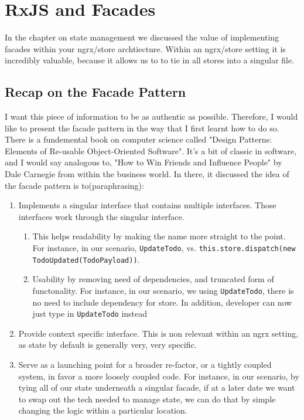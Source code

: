 \chapter{ RxJS and Facades }
In the chapter on state management we discussed the value of implementing facades within your ngrx/store archtiecture. Within an ngrx/store setting it is incredibly valuable, because it allows us to to tie in all stores into a singular file. 

\section{Recap on the Facade Pattern}
I want this piece of information to be as authentic as possible. Therefore, I would like to present the facade pattern in the way that I first learnt how to do so. There is a fundemental book on computer science called "Design Patterns: Elements of Re-usable Object-Oriented Software". It's a bit of classic in software, and I would say analogous to, "How to Win Friends and Influence People" by Dale Carnegie from within the business world. In there, it discussed the idea of the facade pattern is to(paraphrasing): 
\begin{enumerate}
  \item Implements a singular interface that contains multiple interfaces. Those interfaces work through the singular interface.
  \begin{enumerate}
    \item This helps readability by making the name more straight to the point. For instance, in our scenario, \lstinline{UpdateTodo}, vs. \lstinline{this.store.dispatch(new TodoUpdated(TodoPayload))}. 
    \item Usability by removing need of dependencies, and truncated form of functonality. For instance, in our scenario, we using \lstinline{UpdateTodo}, there is no need to include dependency for store. In addition, developer can now just type in \lstinline{UpdateTodo} instead 
  \end{enumerate}
  \item Provide context specific interface. This is non relevant within an ngrx setting, as state by default is generally very, very specific.
  \item Serve as a launching point for a broader re-factor, or a tightly coupled system, in favor a more loosely coupled code. For instance, in our scenario, by tying all of our state underneath a singular facade, if at a later date we want to swap out the tech needed to manage state, we can do that by simple changing the logic within a particular location. 
\end{enumerate}

